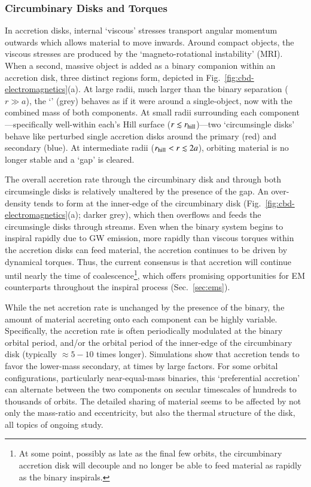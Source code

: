 \documentclass[onecolumn,authoryear]{els-mrw}
\begin{document}
\subsubsection{Circumbinary Disks and Torques}


In accretion disks, internal `viscous' stresses transport angular momentum outwards which allows material to move inwards.  Around compact objects, the viscous stresses are produced by the `magneto-rotational instability' (MRI).  When a second, massive object is added as a binary companion within an accretion disk, three distinct regions form, depicted in Fig.~\ref{fig:cbd-electromagnetics}(a).  At large radii, much larger than the binary separation ($r \gg a$), the `' (grey) behaves as if it were around a single-object, now with the combined mass of both components.  At small radii surrounding each component---specifically well-within each's Hill surface ($r \lesssim r_{\textrm{hill}}$)---two `circumsingle disks' behave like perturbed single accretion disks around the primary (red) and secondary (blue).  At intermediate radii ($r_{\textrm{hill}} < r \lesssim 2 a$), orbiting material is no longer stable and a `gap' is cleared.

The overall accretion rate through the circumbinary disk and through both circumsingle disks is relatively unaltered by the presence of the gap.  An over-density tends to form at the inner-edge of the circumbinary disk (Fig.~\ref{fig:cbd-electromagnetics}(a); darker grey), which then overflows and feeds the circumsingle disks through streams.  Even when the binary system begins to inspiral rapidly due to GW emission, more rapidly than viscous torques within the accretion disks can feed material, the accretion continues to be driven by dynamical torques.  Thus, the current consensus is that accretion will continue until nearly the time of coalescence\footnote{At some point, possibly as late as the final few orbits, the circumbinary accretion disk will decouple and no longer be able to feed material as rapidly as the binary inspirals.}, which offers promising opportunities for EM counterparts throughout the inspiral process (Sec.~\ref{sec:ems}).

While the net accretion rate is unchanged by the presence of the binary, the amount of material accreting onto each component can be highly variable.  Specifically, the accretion rate is often periodically modulated at the binary orbital period, and/or the orbital period of the inner-edge of the circumbinary disk (typically $\approx 5-10$ times longer).  Simulations show that accretion tends to favor the lower-mass secondary, at times by large factors.  For some orbital configurations, particularly near-equal-mass binaries, this `preferential accretion' can alternate between the two components on secular timescales of hundreds to thousands of orbits.  The detailed sharing of material seems to be affected by not only the mass-ratio and eccentricity, but also the thermal structure of the disk, all topics of ongoing study.
\end{document}
